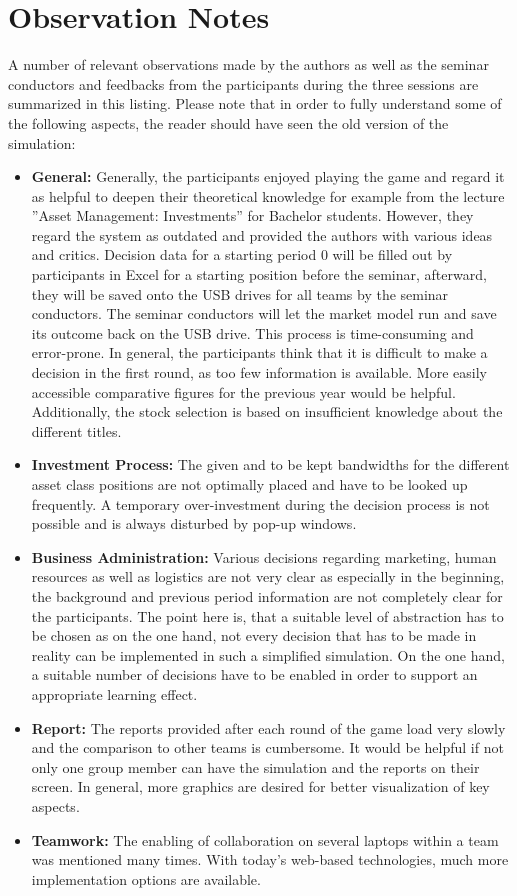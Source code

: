 \section{Observation Notes}
\label{sec:appendix_observation_notes}

A number of relevant observations made by the authors as well as the seminar conductors and feedbacks from the participants during the three sessions are summarized in this listing. Please note that in order to fully understand some of the following aspects, the reader should have seen the old version of the simulation:

\begin{itemize}
  \item \textbf{General:} Generally, the participants enjoyed playing the game and regard it as helpful to deepen their theoretical knowledge for example from the lecture ''Asset Management: Investments'' for Bachelor students. However, they regard the system as outdated and provided the authors with various ideas and critics. Decision data for a starting period 0 will be filled out by participants in Excel for a starting position before the seminar, afterward, they will be saved onto the USB drives for all teams by the seminar conductors. The seminar conductors will let the market model run and save its outcome back on the USB drive. This process is time-consuming and error-prone. In general, the participants think that it is difficult to make a decision in the first round, as too few information is available. More easily accessible comparative figures for the previous year would be helpful. Additionally, the stock selection is based on insufficient knowledge about the different titles.
  \item \textbf{Investment Process:} The given and to be kept bandwidths for the different asset class positions are not optimally placed and have to be looked up frequently. A temporary over-investment during the decision process is not possible and is always disturbed by pop-up windows.
  \item \textbf{Business Administration:} Various decisions regarding marketing, human resources as well as logistics are not very clear as especially in the beginning, the background and previous period information are not completely clear for the participants. The point here is, that a suitable level of abstraction has to be chosen as on the one hand, not every decision that has to be made in reality can be implemented in such a simplified simulation. On the one hand, a suitable number of decisions have to be enabled in order to support an appropriate learning effect.
  \item \textbf{Report:} The reports provided after each round of the game load very slowly and the comparison to other teams is cumbersome. It would be helpful if not only one group member can have the simulation and the reports on their screen. In general, more graphics are desired for better visualization of key aspects.
  \item \textbf{Teamwork:} The enabling of collaboration on several laptops within a team was mentioned many times. With today's web-based technologies, much more implementation options are available.
\end{itemize}

